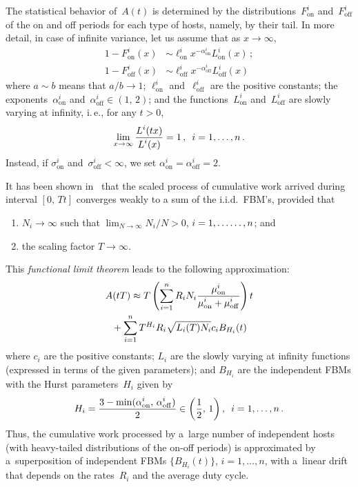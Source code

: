 \begin{multicols}{2}
The statistical behavior of~$A(t)$ is determined by the distributions~$F_{\mathrm{on}}^i$ 
and~$F_{\mathrm{off}}^i$ of the on and off periods for each type of hosts, namely,
 by their tail. 
In more detail, in case of infinite variance, let us assume that as $x \to \infty$,
\begin{align*}
1-F_{\mathrm{on}}^i(x)& \sim  \ell_{\mathrm{on}}^i x^{-\alpha_{\mathrm{on}}^i}L_{\mathrm{on}}^i(x)\,;\\
1-F^i_{\mathrm{off}}(x)& \sim  \ell_{\mathrm{off}}^i x^{-\alpha_{\mathrm{off}}^i}L_{\mathrm{off}}^i(x)
\end{align*}
where   $a \sim b$  means that $a/b\to 1$;    
$\ell_{\mathrm{on}}^i$ and~$\ell_{\mathrm{off}}^i$ are the positive constants; the 
exponents~$\alpha_{\mathrm{on}}^i$ and~$\alpha_{\mathrm{off}}^i\in (1,\,2)$; 
and the functions~$L_{\mathrm{on}}^i$ 
and~$L_{\mathrm{\mathrm{off}}}^i$ are slowly varying at infinity, i.\,e., for any $t >0$,
$$
\lim_{x \to \infty} \displaystyle\frac{\displaystyle L^i(tx)\mathstrut}{\displaystyle L^i(x)\mathstrut}=1\,,\enskip i=1,\ldots,n\,.
$$
Instead, if $\sigma_{\mathrm{on}}^i$ and~$\sigma_{\mathrm{off}}^i <\infty$, we  set 
$\alpha_{\mathrm{on}}^i=\alpha_{\mathrm{off}}^i=2$. 

It has been  shown in~\cite{4-luk-1} that the scaled process of cumulative  
work arrived during interval  $[0,\,Tt]$ converges weakly to a sum of the i.i.d.\
 FBM's,  provided that 
\begin{enumerate}[(1)]
    \item $N_i\to \infty$ such that
$\lim\nolimits_{N\to \infty}N_i/N>0$, $i=1,\ldots\linebreak \ldots , n$; and
\item  the scaling factor $T\to \infty$.
\end{enumerate}

This \textit{functional limit theorem} leads to the following approximation:
\begin{multline*}
A(tT)\approx T\left( \sum\limits_{i=1}^n R_i N_i
\displaystyle\frac{\displaystyle \mu_{\mathrm{on}}^i\mathstrut}{\displaystyle \mu_{\mathrm{on}}^i+\mu_{\mathrm{off}}^i\mathstrut} \right)t \\
{}+ \sum\limits_{i=1}^n
T^{H_i}R_i \sqrt{L_i(T)N_i}c_i B_{H_i}(t) 
\end{multline*}
where $c_i$ are the positive constants; $L_i$ are the slowly varying at
infinity functions (expressed in terms of the given  parameters); and
$B_{H_i}$ are the independent FBMs with the Hurst parameters~$H_i$ given by
$$
H_i=\displaystyle\frac{\displaystyle 3-\min(\alpha_{\mathrm{on}}^i,\,\alpha_{\mathrm{off}}^i)\mathstrut}{\displaystyle 2\mathstrut}\in
\left(\displaystyle\frac{\displaystyle 1\mathstrut}{\displaystyle 2\mathstrut},\,1 \right),\enskip i=1,\ldots, n\,.
$$
Thus, the cumulative work processed by a~large number of independent hosts 
(with heavy-tailed distributions of the on-off periods) is approximated by 
a~superposition of independent FBMs  $\{B_{H_i}(t)\}$, 
$i=1,\dots,n$,  with a~linear drift that depends on the rates~$R_i$ and 
the average duty cycle.


\end{multicols}
